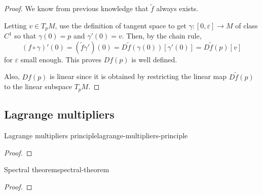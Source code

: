\documentclass[12pt]{extarticle}
\numberwithin{equation}{subsection}
\begin{document}
\begin{proof}
	We know from previous knowledge that $\tilde f$ always exists.

	Letting $v \in T_pM$, use the definition of tangent space to get $\gamma: [0, \varepsilon] \to M$
	of class $C^1$ so that $\gamma(0) = p$ and $\gamma'(0) = v$.
	Then, by the chain rule,
	\begin{equation}
		(f\circ \gamma)'(0) = (\tilde f \gamma')(0) = D \tilde f(\gamma(0))[\gamma'(0)] = D \tilde
		f(p)[v]
	\end{equation}
	for $\varepsilon$ small enough.
	This proves $Df(p)$ is well defined.

	Also, $Df(p)$ is linear since it is obtained by restricting the linear map $D \tilde f(p)$ to the
	linear subspace $T_pM$.
\end{proof}

\subsection{Lagrange multipliers}

\begin{theorem}{Lagrange multipliers principle}{lagrange-multipliers-principle}

\end{theorem}
\begin{proof}

\end{proof}


\begin{corollary}{Spectral theorem}{spectral-theorem}

\end{corollary}
\begin{proof}

\end{proof}
\end{document}
